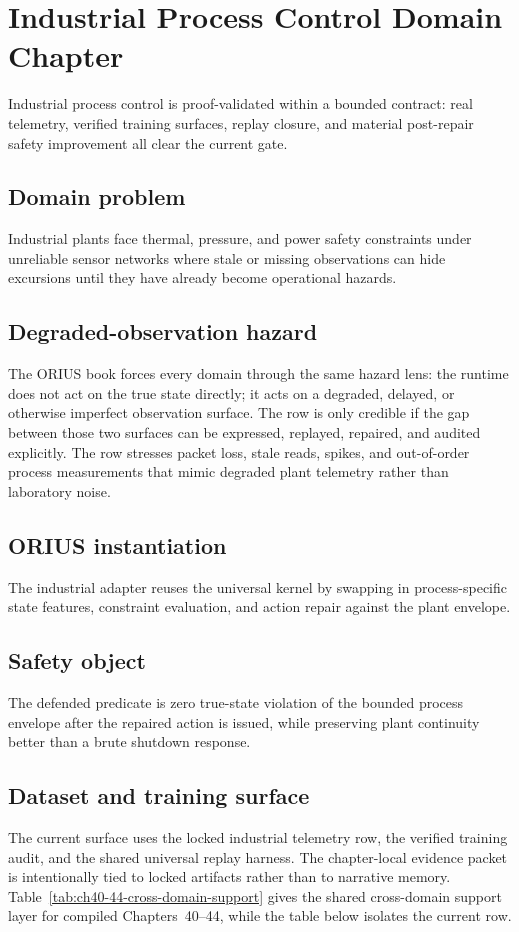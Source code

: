 \chapter{Industrial Process Control Domain Chapter}
\label{ch:domain-industrial}

Industrial process control is proof-validated within a bounded contract: real telemetry, verified training surfaces, replay closure, and material post-repair safety improvement all clear the current gate.

\section{{Domain problem}}
Industrial plants face thermal, pressure, and power safety constraints under unreliable sensor networks where stale or missing observations can hide excursions until they have already become operational hazards.

\section{{Degraded-observation hazard}}
The ORIUS book forces every domain through the same hazard lens: the runtime does not act
on the true state directly; it acts on a degraded, delayed, or otherwise imperfect
observation surface.  The row is only credible if the gap between those two surfaces can
be expressed, replayed, repaired, and audited explicitly.
The row stresses packet loss, stale reads, spikes, and out-of-order process measurements that mimic degraded plant telemetry rather than laboratory noise.

\section{{ORIUS instantiation}}
The industrial adapter reuses the universal kernel by swapping in process-specific state features, constraint evaluation, and action repair against the plant envelope.

\section{{Safety object}}
The defended predicate is zero true-state violation of the bounded process envelope after the repaired action is issued, while preserving plant continuity better than a brute shutdown response.

\section{{Dataset and training surface}}
The current surface uses the locked industrial telemetry row, the verified training audit, and the shared universal replay harness.
The chapter-local evidence packet is intentionally tied to locked artifacts rather than to
narrative memory.  Table~\ref{tab:ch40-44-cross-domain-support} gives the shared cross-domain
support layer for compiled Chapters~40--44, while the table below isolates the current row.

